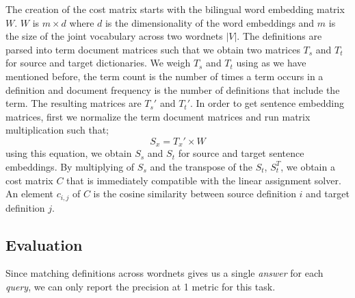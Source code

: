 The creation of the cost matrix starts with the bilingual word embedding matrix $W$.
$W$ is $m \times d$ where $d$ is the dimensionality of the word embeddings and $m$ is the size of the joint vocabulary across two wordnets $|V|$.
The definitions are parsed into term document matrices such that we obtain two matrices $T_{s}$ and $T_{t}$ for source and target dictionaries.
We weigh $T_s$ and $T_t$ using \tfidf{} as we have mentioned before, the term count is the number of times a term occurs in a definition and document frequency is the number of definitions that include the term.
The resulting matrices are $T_s'$ and $T_t'$.
In order to get sentence embedding matrices, first we normalize the term document matrices and run matrix multiplication such that;
\begin{equation}
    S_{x} = T_x' \times W
\end{equation}
using this equation, we obtain $S_s$ and $S_t$ for source and target sentence embeddings.
By multiplying of $S_s$ and the transpose of the $S_t$, $S_t^T$, we obtain a cost matrix $C$ that is immediately compatible with the linear assignment solver.
An element $c_{i,j}$ of $C$ is the cosine similarity between source definition $i$ and target definition $j$.

\subsection{Evaluation}%
\label{sub:evaluation}

Since matching definitions across wordnets gives us a single \emph{answer} for each \emph{query}, we can only report the precision at 1 metric for this task.




